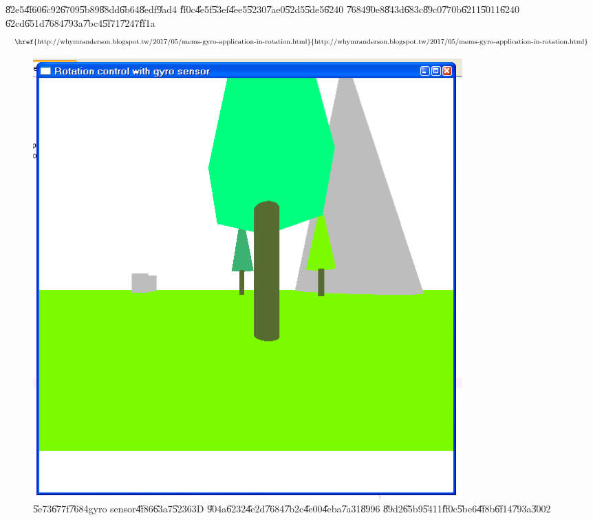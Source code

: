 \bigskip

\U{82e5}\U{4f60}\U{6c92}\U{6709}\U{5b89}\U{88dd}\U{6b64}\U{8edf}\U{9ad4}%
\U{ff0c}\U{4e5f}\U{53ef}\U{4ee5}\U{5230}\U{7ae0}\U{52d5}\U{5de5}\U{6240}%
\U{7684}\U{90e8}\U{843d}\U{683c}\U{89c0}\U{770b}\U{6211}\U{5011}\U{6240}%
\U{62cd}\U{651d}\U{7684}\U{793a}\U{7bc4}\U{5f71}\U{7247}\U{ff1a}%
\begin{equation*}
\text{\href{http://whymranderson.blogspot.tw/2017/05/mems-gyro-application-in-rotation.html%
}{%
http://whymranderson.blogspot.tw/2017/05/mems-gyro-application-in-rotation.html%
}}
\end{equation*}

\begin{figure}[th]
\caption{\U{5e73}\U{677f}\U{7684}gyro sensor\U{4f86}\U{63a7}\U{5236}3D%
\U{904a}\U{6232}\U{4e2d}\U{7684}\U{7b2c}\U{4e00}\U{4eba}\U{7a31}\U{8996}%
\U{89d2}\U{65b9}\U{5411}\U{ff0c}\U{5be6}\U{4f8b}\U{6f14}\U{793a}\U{3002}}
\begin{center}
\includegraphics[width=0.8\textwidth]{./figs/ASUS_3D_control_1.png}
\end{center}
\end{figure}

\bigskip


